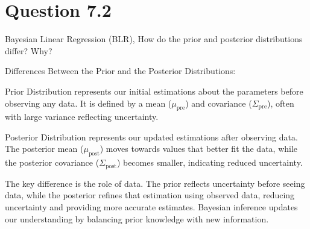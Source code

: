 \documentclass[addpoints]{exam}
\begin{document}
\section{Question 7.2}

Bayesian Linear Regression (BLR), How do the prior and posterior distributions differ? Why?

Differences Between the Prior and the Posterior Distributions:

Prior Distribution represents our initial estimations about the parameters before observing any data. It is defined by a mean ($\mu_\text{pre}$) and covariance ($\Sigma_\text{pre}$), often with large variance reflecting uncertainty.

Posterior Distribution represents our updated estimations after observing data. The posterior mean ($\mu_\text{post}$) moves towards values that better fit the data, while the posterior covariance ($\Sigma_\text{post}$) becomes smaller, indicating reduced uncertainty.

The key difference is the role of data. The prior reflects uncertainty before seeing data, while the posterior refines that estimation using observed data, reducing uncertainty and providing more accurate estimates. Bayesian inference updates our understanding by balancing prior knowledge with new information.
\end{document}
